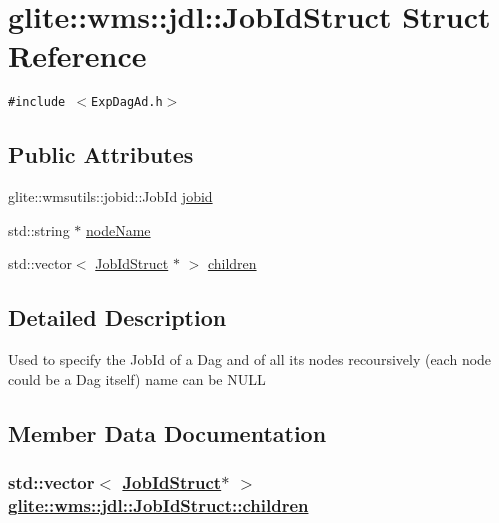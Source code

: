 \hypertarget{structglite_1_1wms_1_1jdl_1_1JobIdStruct}{
\section{glite::wms::jdl::Job\-Id\-Struct Struct Reference}
\label{structglite_1_1wms_1_1jdl_1_1JobIdStruct}
}
{\tt \#include $<$Exp\-Dag\-Ad.h$>$}

\subsection*{Public Attributes}
\begin{CompactItemize}
\item 
glite::wmsutils::jobid::Job\-Id \hyperlink{structglite_1_1wms_1_1jdl_1_1JobIdStruct_o0}{jobid}
\item 
std::string $\ast$ \hyperlink{structglite_1_1wms_1_1jdl_1_1JobIdStruct_o1}{node\-Name}
\item 
std::vector$<$ \hyperlink{structglite_1_1wms_1_1jdl_1_1JobIdStruct}{Job\-Id\-Struct} $\ast$ $>$ \hyperlink{structglite_1_1wms_1_1jdl_1_1JobIdStruct_o2}{children}
\end{CompactItemize}


\subsection{Detailed Description}
Used to specify the Job\-Id of a Dag and of all its nodes recoursively (each node could be a Dag itself) name can be NULL 



\subsection{Member Data Documentation}
\hypertarget{structglite_1_1wms_1_1jdl_1_1JobIdStruct_o2}{
\subsubsection[children]{\setlength{\rightskip}{0pt plus 5cm}std::vector$<$ \hyperlink{structglite_1_1wms_1_1jdl_1_1JobIdStruct}{Job\-Id\-Struct}$\ast$ $>$ \hyperlink{structglite_1_1wms_1_1jdl_1_1JobIdStruct_o2}{glite::wms::jdl::Job\-Id\-Struct::children}}}
\label{structglite_1_1wms_1_1jdl_1_1JobIdStruct_o2}


